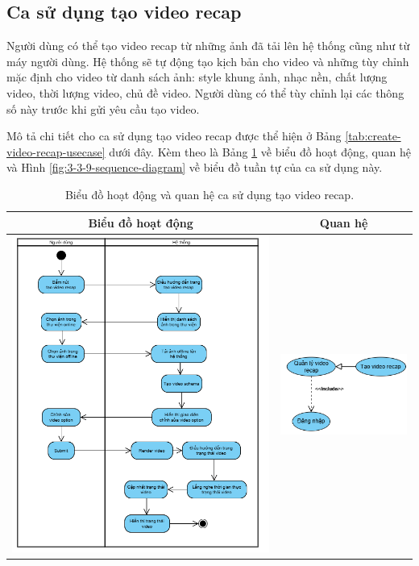 \subsection{Ca sử dụng tạo video recap}

Người dùng có thể tạo video recap từ những ảnh đã tải lên hệ thống cũng như từ máy người dùng. Hệ thống sẽ tự động tạo kịch bản cho video và những tùy chỉnh mặc định cho video từ danh sách ảnh: style khung ảnh, nhạc nền, chất lượng video, thời lượng video, chủ đề video. Người dùng có thể tùy chỉnh lại các thông số này trước khi gửi yêu cầu tạo video. 

Mô tả chi tiết cho ca sử dụng tạo video recap được thể hiện ở Bảng \ref{tab:create-video-recap-usecase} dưới đây. Kèm theo là Bảng \ref{tab:create-video-recap-usecase-activity} về biểu đồ hoạt động, quan hệ và Hình \ref{fig:3-3-9-sequence-diagram} về biểu đồ tuần tự của ca sử dụng này. 

\noindent 
\begin{table}[H]
\centering
\begin{tabular}{| c | c |}
    \hline
    \textbf{Biểu đồ hoạt động} & \textbf{Quan hệ} \\ 
    \hline
    \includegraphics[width=0.6\linewidth]{figures/c3/3-3-9-activity-diagram.png} 
    &  
    \includegraphics[width=0.35\linewidth]{figures/c3/3-3-9-relationship.png} \\ 
    \hline
\end{tabular}
\caption{Biểu đồ hoạt động và quan hệ ca sử dụng tạo video recap.}
\label{tab:create-video-recap-usecase-activity}
\end{table}

